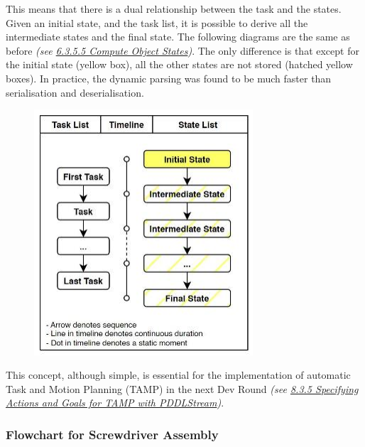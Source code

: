 \documentclass[11pt]{book}
\begin{document}
This means that there is a dual relationship between the task and the states. Given an initial state, and the task list, it is possible to derive all the intermediate states and the final state. The following diagrams are the same as before \textit{(see \uline{6.3.5.5 Compute Object States})}. The only difference is that except for the initial state (yellow box), all the other states are not stored (hatched yellow boxes). In practice, the dynamic parsing was found to be much faster than serialisation and deserialisation.

\begin{figure}[H]
\includegraphics[width=8.16cm,height=9.14cm]{./images/image13.jpeg}
\end{figure}


This concept, although simple, is essential for the implementation of automatic Task and Motion Planning (TAMP) in the next Dev Round \textit{(see \uline{8.3.5 Specifying Actions and Goals for TAMP with PDDLStream})}.

\subsubsection{Flowchart for Screwdriver Assembly}
\end{document}
